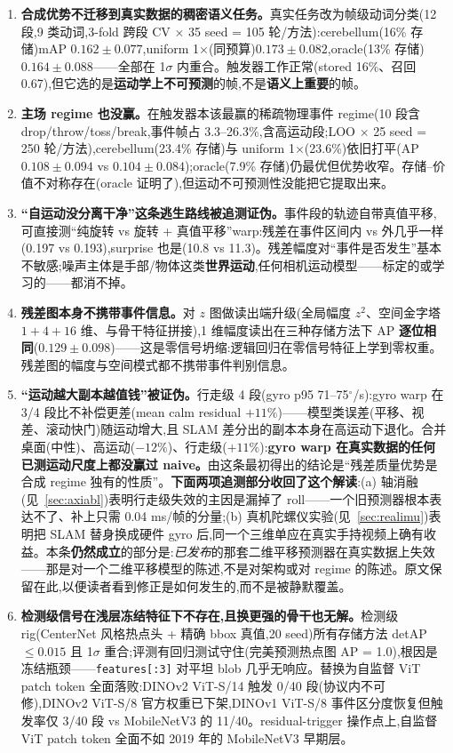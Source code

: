 \documentclass[UTF8,12pt,a4paper]{ctexart}
\begin{document}
\label{sec:negatives}

\begin{enumerate}
  \item \textbf{合成优势不迁移到真实数据的稠密语义任务。}真实任务改为帧级动词分类(12 段,9 类动词,3-fold 跨段 CV $\times$ 35 seed = 105 轮/方法):cerebellum(16\% 存储)mAP $0.162{\pm}0.077$,uniform 1$\times$(同预算)$0.173{\pm}0.082$,oracle(13\% 存储)$0.164{\pm}0.088$——全部在 1$\sigma$ 内重合。触发器工作正常(stored 16\%、召回 0.67),但它选的是\textbf{运动学上不可预测}的帧,不是\textbf{语义上重要}的帧。
  \item \textbf{主场 regime 也没赢。}在触发器本该最赢的稀疏物理事件 regime(10 段含 drop/throw/toss/break,事件帧占 3.3--26.3\%,含高运动段;LOO $\times$ 25 seed = 250 轮/方法),cerebellum(23.4\% 存储)与 uniform 1$\times$(23.6\%)依旧打平(AP $0.108{\pm}0.094$ vs $0.104{\pm}0.084$);oracle(7.9\% 存储)仍最优但优势收窄。存储--价值不对称存在(oracle 证明了),但运动不可预测性没能把它提取出来。
  \item \textbf{``自运动没分离干净''这条逃生路线被追测证伪。}事件段的轨迹自带真值平移,可直接测``纯旋转 vs 旋转 + 真值平移''warp:残差在事件区间内 vs 外几乎一样(0.197 vs 0.193),surprise 也是(10.8 vs 11.3)。残差幅度对``事件是否发生''基本不敏感;噪声主体是手部/物体这类\textbf{世界运动},任何相机运动模型——标定的或学习的——都消不掉。
  \item \textbf{残差图本身不携带事件信息。}对 $z$ 图做读出端升级(全局幅度 $z^2$、空间金字塔 $1{+}4{+}16$ 维、与骨干特征拼接),1 维幅度读出在三种存储方法下 AP \textbf{逐位相同}($0.129{\pm}0.098$)——这是零信号坍缩:逻辑回归在零信号特征上学到零权重。残差图的幅度与空间模式都不携带事件判别信息。
  \item \textbf{``运动越大副本越值钱''被证伪。}行走级 4 段(gyro p95 71--75$^\circ$/s):gyro warp 在 3/4 段比不补偿更差(mean calm residual $+11\%$)——模型类误差(平移、视差、滚动快门)随运动增大,且 SLAM 差分出的副本本身在高运动下退化。合并桌面(中性)、高运动($-12\%$)、行走级($+11\%$):\textbf{gyro warp 在真实数据的任何已测运动尺度上都没赢过 naive。}由这条最初得出的结论是``残差质量优势是合成 regime 独有的性质''。\textbf{下面两项追测部分收回了这个解读}:(a) 轴消融(见~\ref{sec:axiabl})表明行走级失效的主因是漏掉了 roll——一个旧预测器根本表达不了、补上只需 0.04 ms/帧的分量;(b) 真机陀螺仪实验(见~\ref{sec:realimu})表明把 SLAM 替身换成硬件 gyro 后,同一个三维单应在真实手持视频上确有收益。本条\textbf{仍然成立}的部分是:\emph{已发布}的那套二维平移预测器在真实数据上失效——那是对一个二维平移模型的陈述,不是对架构或对 regime 的陈述。原文保留在此,以便读者看到修正是如何发生的,而不是被静默覆盖。
  \item \textbf{检测级信号在浅层冻结特征下不存在,且换更强的骨干也无解。}检测级 rig(CenterNet 风格热点头 + 精确 bbox 真值,20 seed)所有存储方法 detAP $\le 0.015$ 且 1$\sigma$ 重合;评测有回归测试守住(完美预测热点图 AP = 1.0),根因是冻结瓶颈——\texttt{features[:3]} 对平坦 blob 几乎无响应。替换为自监督 ViT patch token\cite{dino2021,dinov2} 全面落败:DINOv2 ViT-S/14 触发 0/40 段(协议内不可修),DINOv2 ViT-S/8 官方权重已下架,DINOv1 ViT-S/8 事件区分度恢复但触发率仅 3/40 段 vs MobileNetV3 的 11/40。residual-trigger 操作点上,自监督 ViT patch token 全面不如 2019 年的 MobileNetV3 早期层。
\end{enumerate}
\end{document}

